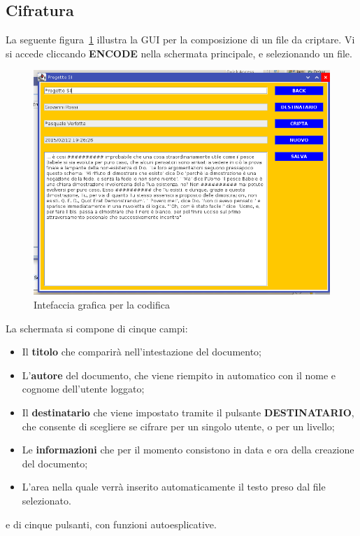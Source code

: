 \subsection{Cifratura}
La seguente figura~\ref{fig:encode} illustra la GUI per la composizione di un file da criptare. Vi si accede cliccando \textbf{ENCODE} nella schermata principale, e selezionando un file.

	\begin{center}	
		\begin{figure}[H]
		\centering
		\includegraphics[scale=0.6]{Immagini/writelayout}
		\caption[GUI di encode]{Intefaccia grafica per la codifica}
		\label{fig:encode}
		\end{figure}
	\end{center}
	
La schermata si compone di cinque campi:
\begin{itemize}
	\item Il \textbf{titolo}  che comparirà nell'intestazione del documento;
	\item L'\textbf{autore} del documento, che viene riempito in automatico con il nome e cognome dell'utente loggato;
	\item Il \textbf{destinatario} che viene impostato tramite il pulsante \textbf{DESTINATARIO}, che consente di scegliere se cifrare per un singolo utente, o per un livello;
	\item Le \textbf{informazioni} che per il momento consistono in data e ora della creazione del documento;
	\item L'area nella quale verrà inserito automaticamente il testo preso dal file selezionato.
\end{itemize}
e di cinque pulsanti, con funzioni autoesplicative. 

